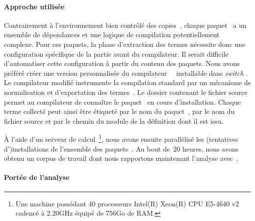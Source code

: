 


\paragraph{Approche utilisée}

Contrairement à l'environnement bien contrôlé des
copies~{\LearnOCaml}, chaque paquet~{\Opam} a un ensemble de
dépendances et une logique de compilation potentiellement complexe.
Pour ces paquets, la phase d'extraction des termes {\LambdaCode}
nécessite donc une configuration spécifique de la partie avant du
compilateur. Il serait difficile d'automatiser cette configuration à
partir du contenu des paquets. Nous avons préféré créer une version
personnalisée du compilateur~{\OCaml}~\cite{custom-ocaml} installable
dans \textit{switch} {\Opam}.
%
Le compilateur modifié instrumente la compilation standard par un
mécanisme de normalisation et d'exportation des termes~{\LambdaCode}.
Le dossier contenant le fichier source permet au compilateur de connaître le
paquet~{\Opam} en cours d'installation. Chaque terme collecté peut
ainsi être étiqueté par le nom du paquet~\Opam, par le nom du fichier
source et par le chemin du module de la définition dont il est issu.

À l'aide d'un serveur de calcul~\footnote{Une machine possédant 40
processeurs Intel(R) Xeon(R) CPU E5-4640 v2 cadencé à 2.20GHz équipé
de 756Go de RAM.}, nous avons ensuite parallélisé les (tentatives
d')installations de l'ensemble des paquets~\Opam. Au bout de~$20$
heures, nous avons obtenu un corpus de travail dont nous rapportons
maintenant l'analyse avec~{\Asak}.

\paragraph{Portée de l'analyse}

